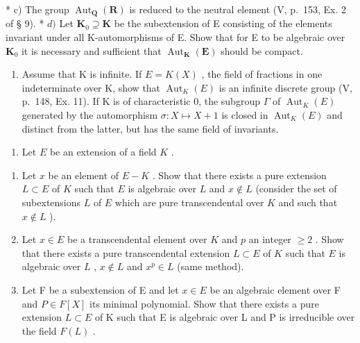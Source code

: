 * c) The group \(\operatorname{Aut}_{\mathbf{Q}}(\mathbf{R})\) is reduced to the neutral element (V, p.~153, Ex. 2 of § 9). * \(d)\) Let \(\mathbf{K}_0 \supseteq \mathbf{K}\) be the subextension of E consisting of the elements invariant under all K-automorphisms of E. Show that for E to be algebraic over \(\mathbf{K}_0\) it is necessary and sufficient that \(\operatorname{Aut}_{\mathbf{K}}(\mathbf{E})\) should be compact.

\begin{enumerate}
\def\labelenumi{\alph{enumi})}
\setcounter{enumi}{4}
\tightlist
\item
  Assume that K is infinite. If \(E = K(X)\) , the field of fractions in one indeterminate over K, show that \(\operatorname{Aut}_{K}(E)\) is an infinite discrete group (V, p.~148, Ex. 11). If K is of characteristic 0, the subgroup \(\Gamma\) of \(\operatorname{Aut}_{K}(E)\) generated by the automorphism \(\sigma : X \mapsto X + 1\) is closed in \(\operatorname{Aut}_{K}(E)\) and distinct from the latter, but has the same field of invariants.
\end{enumerate}

\begin{enumerate}
\def\labelenumi{\arabic{enumi})}
\setcounter{enumi}{7}
\tightlist
\item
  Let \(E\) be an extension of a field \(K\) .
\end{enumerate}

\begin{enumerate}
\def\labelenumi{\alph{enumi})}
\item
  Let \(x\) be an element of \(E - K\) . Show that there exists a pure extension \(L \subset E\) of \(K\) such that \(E\) is algebraic over \(L\) and \(x \notin L\) (consider the set of subextensions \(L\) of \(E\) which are pure transcendental over \(K\) and such that \(x \notin L\) ).
\item
  Let \(x \in E\) be a transcendental element over \(K\) and \(p\) an integer \(\geqslant 2\) . Show that there exists a pure transcendental extension \(L \subset E\) of \(K\) such that \(E\) is algebraic over \(L\) , \(x \notin L\) and \(x^p \in L\) (same method).
\item
  Let F be a subextension of E and let \(x \in E\) be an algebraic element over F and \(P \in F[X]\) its minimal polynomial. Show that there exists a pure extension \(L \subset E\) of K such that E is algebraic over L and P is irreducible over the field \(F(L)\) .
\end{enumerate}

